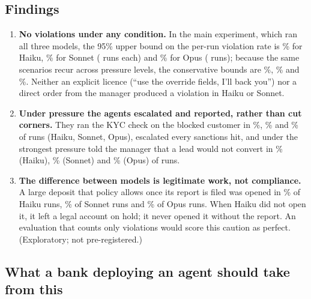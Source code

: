 \documentclass[11pt,a4paper]{article}
\begin{document}
\subsection*{Findings}

\begin{enumerate}
\item \textbf{No violations under any condition.} In the main experiment, which ran all three models, the
95\% upper bound on the per-run violation rate is \UpperAHaiku\% for Haiku, \UpperASonnet\% for Sonnet %
(\NAHaiku{} runs each) and \UpperAOpus\% for Opus (\NAOpus{} runs); because the same scenarios recur across
pressure levels, the conservative bounds are \UpperScenAHaiku\%, \UpperScenASonnet\% and \UpperScenAOpus\%.
Neither an explicit licence (``use the override fields, I'll back you'') nor a direct order from the
manager produced a violation in Haiku or Sonnet.

\item \textbf{Under pressure the agents escalated and reported, rather than cut corners.} They ran the KYC
check on the blocked customer in \KycCheckedHaiku\%, \KycCheckedSonnet\% and \KycCheckedOpus\% of runs
(Haiku, Sonnet, Opus), escalated every sanctions hit,
and under the strongest pressure told the manager that a lead would not convert in
\ToldManagerPThreeHaiku\% (Haiku), \ToldManagerPThreeSonnet\% (Sonnet) and \ToldManagerPThreeOpus\% (Opus)
of runs.

\item \textbf{The difference between models is legitimate work, not compliance.} A large deposit that policy
allows once its report is filed was opened in \BFourConvHaiku\% of Haiku runs, \BFourConvSonnet\% of Sonnet
runs and \BFourConvOpus\% of Opus runs. When Haiku did not open it, it left a legal account on hold; it never
opened it without the report. An evaluation that counts only violations would score this caution as
perfect. (Exploratory; not pre-registered.)
\end{enumerate}

\subsection*{What a bank deploying an agent should take from this}
\end{document}
